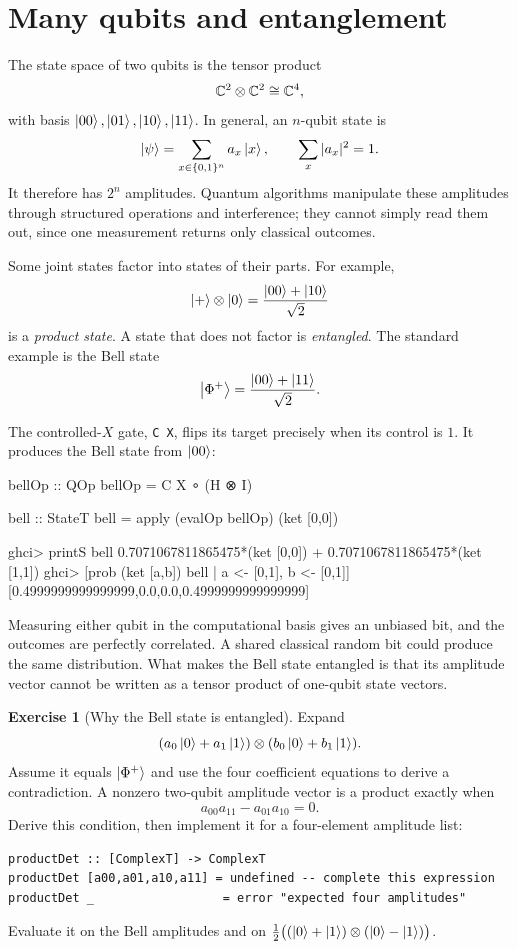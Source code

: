 \documentclass[11pt,a4paper]{article}
\theoremstyle{definition}
\newtheorem{exercise}{Exercise}[section]
\begin{document}
\section{Many qubits and entanglement}
\label{sec:many}

The state space of two qubits is the tensor product
\[
  \mathbb{C}^2\otimes\mathbb{C}^2\cong\mathbb{C}^4,
\]
with basis $\left| 00 \right\rangle,\left| 01 \right\rangle,\left| 10 \right\rangle,\left| 11 \right\rangle$.  In general, an
$n$-qubit state is
\[
  \left| \psi \right\rangle=\sum_{x\in\{0,1\}^n}a_x\left| x \right\rangle,
  \qquad \sum_x|a_x|^2=1.
\]
It therefore has $2^n$ amplitudes.  Quantum algorithms manipulate these
amplitudes through structured operations and interference; they cannot simply
read them out, since one measurement returns only classical outcomes.

Some joint states factor into states of their parts.  For example,
\[
  \left| + \right\rangle\otimes\left| 0 \right\rangle=\frac{\left| 00 \right\rangle+\left| 10 \right\rangle}{\sqrt2}
\]
is a \emph{product state}.  A state that does not factor is
\emph{entangled}.  The standard example is the Bell state
\[
  \left| \Phi^+ \right\rangle=\frac{\left| 00 \right\rangle+\left| 11 \right\rangle}{\sqrt2}.
\]

The controlled-$X$ gate, \lstinline|C X|, flips its target precisely when
its control is $1$.  It produces the Bell state from $\left| 00 \right\rangle$:
\begin{qppcode}
bellOp :: QOp
bellOp = C X ∘ (H ⊗ I)

bell :: StateT
bell = apply (evalOp bellOp) (ket [0,0])

ghci> printS bell
0.7071067811865475*(ket [0,0]) + 0.7071067811865475*(ket [1,1])
ghci> [prob (ket [a,b]) bell | a <- [0,1], b <- [0,1]]
[0.4999999999999999,0.0,0.0,0.4999999999999999]
\end{qppcode}
Measuring either qubit in the computational basis gives an unbiased bit, and
the outcomes are perfectly correlated.  A shared classical random bit could
produce the same distribution.  What makes the Bell state entangled is that
its amplitude vector cannot be written as a tensor product of one-qubit state
vectors.

\begin{exercise}[Why the Bell state is entangled]
Expand
\[
  (a_0\left| 0 \right\rangle+a_1\left| 1 \right\rangle)\otimes(b_0\left| 0 \right\rangle+b_1\left| 1 \right\rangle).
\]
Assume it equals $\left| \Phi^+ \right\rangle$ and use the four coefficient equations to
derive a contradiction.  A nonzero two-qubit amplitude vector is a product
exactly when
\[
  a_{00}a_{11}-a_{01}a_{10}=0.
\]
Derive this condition, then implement it for a four-element amplitude list:
\begin{lstlisting}
productDet :: [ComplexT] -> ComplexT
productDet [a00,a01,a10,a11] = undefined -- complete this expression
productDet _                  = error "expected four amplitudes"
\end{lstlisting}
Evaluate it on the Bell amplitudes and on
$\frac12\bigl((\left| 0 \right\rangle+\left| 1 \right\rangle)\otimes(\left| 0 \right\rangle-\left| 1 \right\rangle)\bigr)$.
\end{exercise}
\end{document}
